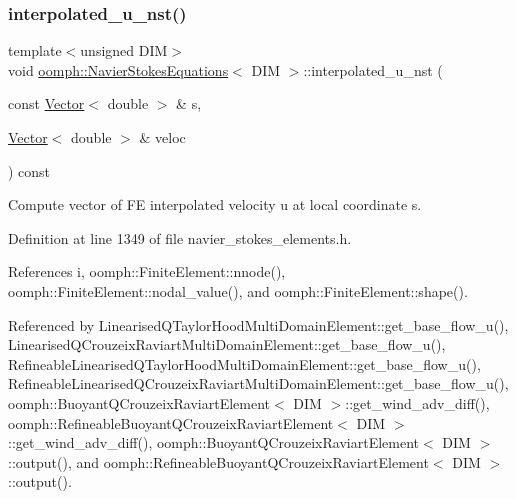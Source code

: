 \subsubsection{\texorpdfstring{interpolated\+\_\+u\+\_\+nst()}{interpolated\_u\_nst()}\hspace{0.1cm}{\footnotesize\ttfamily [1/3]}}
{\footnotesize\ttfamily template$<$unsigned D\+IM$>$ \\
void \hyperlink{classoomph_1_1NavierStokesEquations}{oomph\+::\+Navier\+Stokes\+Equations}$<$ D\+IM $>$\+::interpolated\+\_\+u\+\_\+nst (\begin{DoxyParamCaption}\item[{const \hyperlink{classoomph_1_1Vector}{Vector}$<$ double $>$ \&}]{s,  }\item[{\hyperlink{classoomph_1_1Vector}{Vector}$<$ double $>$ \&}]{veloc }\end{DoxyParamCaption}) const\hspace{0.3cm}{\ttfamily [inline]}}



Compute vector of FE interpolated velocity u at local coordinate s. 



Definition at line 1349 of file navier\+\_\+stokes\+\_\+elements.\+h.



References i, oomph\+::\+Finite\+Element\+::nnode(), oomph\+::\+Finite\+Element\+::nodal\+\_\+value(), and oomph\+::\+Finite\+Element\+::shape().



Referenced by Linearised\+Q\+Taylor\+Hood\+Multi\+Domain\+Element\+::get\+\_\+base\+\_\+flow\+\_\+u(), Linearised\+Q\+Crouzeix\+Raviart\+Multi\+Domain\+Element\+::get\+\_\+base\+\_\+flow\+\_\+u(), Refineable\+Linearised\+Q\+Taylor\+Hood\+Multi\+Domain\+Element\+::get\+\_\+base\+\_\+flow\+\_\+u(), Refineable\+Linearised\+Q\+Crouzeix\+Raviart\+Multi\+Domain\+Element\+::get\+\_\+base\+\_\+flow\+\_\+u(), oomph\+::\+Buoyant\+Q\+Crouzeix\+Raviart\+Element$<$ D\+I\+M $>$\+::get\+\_\+wind\+\_\+adv\+\_\+diff(), oomph\+::\+Refineable\+Buoyant\+Q\+Crouzeix\+Raviart\+Element$<$ D\+I\+M $>$\+::get\+\_\+wind\+\_\+adv\+\_\+diff(), oomph\+::\+Buoyant\+Q\+Crouzeix\+Raviart\+Element$<$ D\+I\+M $>$\+::output(), and oomph\+::\+Refineable\+Buoyant\+Q\+Crouzeix\+Raviart\+Element$<$ D\+I\+M $>$\+::output().

\mbox{\label{classoomph_1_1NavierStokesEquations_a61521b081e019b3803ac824128c54ddc}} 
